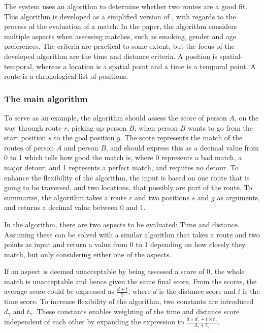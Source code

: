 The system uses an algorithm to determine whether two routes are a good fit.
This algorithm is developed as a simplified version of \citet{ghoseiri2011real}, with regards to the process of the evaluation of a match.
In the paper, the algorithm considers multiple aspects when assessing matches, such as smoking, gender and age preferences.
The criteria are practical to some extent, but the focus of the developed algorithm are the time and distance criteria.
A position is spatial-temporal, whereas a location is a spatial point and a time is a temporal point.
A route is a chronological list of positions.

\subsubsection{The main algorithm}
To serve as an example, the algorithm should assess the score of person $A$, on the way through route $r$, picking up person $B$, when person $B$ wants to go from the start position $s$ to the goal position $g$. 
The score represents the match of the routes of person $A$ and person $B$, and should express this as a decimal value from 0 to 1 which tells how good the match is, where 0 represents a bad match, a major detour, and 1 represents a perfect match, and requires no detour.
To enhance the flexibility of the algorithm, the input is based on one route that is going to be traversed, and two locations, that possibly are part of the route.
To summarize, the algorithm takes a route $r$ and two positions $s$ and $g$ as arguments, and returns a decimal value between 0 and 1.

In the algorithm, there are two aspects to be evaluated: Time and distance.
Assuming these can be solved with a similar algorithm that takes a route and two points as input and return a value from 0 to 1 depending on how closely they match, but only considering either one of the aspects.

If an aspect is deemed unacceptable by being assessed a score of 0, the whole match is unacceptable and hence given the same final score.
From the scores, the average score could be expressed as $\frac{d+t}{2}$, where $d$ is the distance score and $t$ is the time score.
To increase flexibility of the algorithm, two constants are introduced $d_\gamma$ and $t_\gamma$.
These constants enables weighting of the time and distance score independent of each other by expanding the expression to $\frac{d\times d_\gamma+t\times t_\gamma}{d_\gamma+t_\gamma}$.

